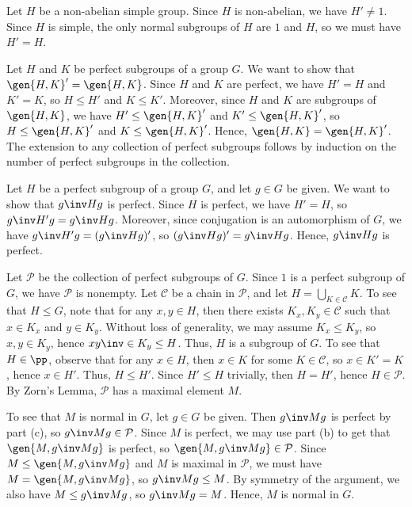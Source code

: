 \begin{solalph}
    \item Let $H$ be a non-abelian simple group. Since $H$ is non-abelian, we have $H' \neq 1$. Since $H$ is simple, the only normal subgroups of $H$ are $1$ and $H$, so we must have $H' = H$.
    \item Let $H$ and $K$ be perfect subgroups of a group $G$. We want to show that $\gen{H, K}' = \gen{H, K}$. Since $H$ and $K$ are perfect, we have $H' = H$ and $K' = K$, so $H \leq H'$ and $K \leq K'$. Moreover, since $H$ and $K$ are subgroups of $\gen{H, K}$, we have $H' \leq \gen{H, K}'$ and $K' \leq \gen{H, K}'$, so $H \leq \gen{H, K}'$ and $K \leq \gen{H, K}'$. Hence, $\gen{H, K} = \gen{H, K}'$. The extension to any collection of perfect subgroups follows by induction on the number of perfect subgroups in the collection.
    \item Let $H$ be a perfect subgroup of a group $G$, and let $g \in G$ be given. We want to show that $g\inv H g$ is perfect. Since $H$ is perfect, we have $H' = H$, so $g\inv H' g = g\inv H g$. Moreover, since conjugation is an automorphism of $G$, we have $g\inv H' g = (g\inv H g)'$, so $(g\inv H g)' = g\inv H g$. Hence, $g\inv H g$ is perfect.
    \item Let $\mathcal{P}$ be the collection of perfect subgroups of $G$. Since $1$ is a perfect subgroup of $G$, we have $\mathcal{P}$ is nonempty. Let $\mathcal{C}$ be a chain in $\mathcal{P}$, and let $H = \bigcup_{K \in \mathcal{C}} K$. To see that $H \leq G$, note that for any $x, y \in H$, then there exists $K_x, K_y \in \mathcal C$ such that $x \in K_x$ and $y \in K_y$. Without loss of generality, we may assume $K_x \leq K_y$, so $x, y \in K_y$, hence $xy\inv \in K_y \leq H$. Thus, $H$ is a subgroup of $G$. To see that $H \in \pp$, observe that for any $x \in H$, then $x \in K$ for some $K \in \mathcal{C}$, so $x \in K' = K$, hence $x \in H'$. Thus, $H \leq H'$. Since $H' \leq H$ trivially, then $H = H'$, hence $H \in \mathcal P$. By Zorn's Lemma, $\mathcal{P}$ has a maximal element $M$. 
    
    To see that $M$ is normal in $G$, let $g \in G$ be given. Then $g\inv M g$ is perfect by part (c), so $g\inv M g \in \mathcal{P}$. Since $M$ is perfect, we may use part (b) to get that $\gen{M, g\inv M g}$ is perfect, so $\gen{M, g\inv M g} \in \mathcal{P}$. Since $M \leq \gen{M, g\inv M g}$ and $M$ is maximal in $\mathcal{P}$, we must have $M = \gen{M, g\inv M g}$, so $g\inv M g \leq M$. By symmetry of the argument, we also have $M \leq g\inv M g$, so $g\inv M g = M$. Hence, $M$ is normal in $G$.
\end{solalph}


